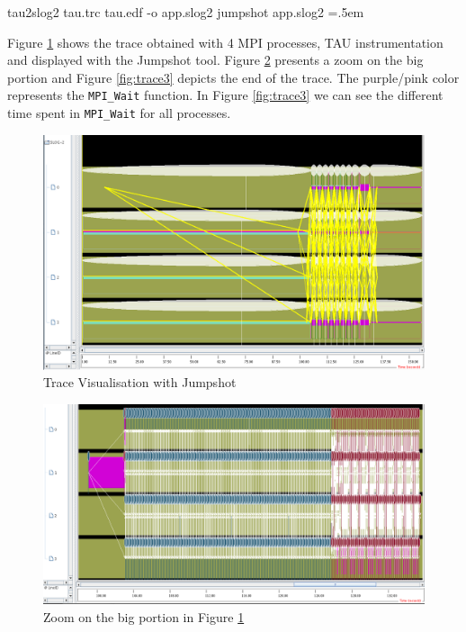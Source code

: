 \documentclass[10pt,twoside]{article}   	%
\newenvironment{cverbatim}
 {\SaveVerbatim{cverb}}
 {\endSaveVerbatim
  \flushleft\fboxrule=0pt\fboxsep=.5em
  \colorbox{cverbbg}{\BUseVerbatim{cverb}}%
  \endflushleft
}
\begin{document}
\begin{cverbatim}
tau2slog2 tau.trc tau.edf  -o app.slog2
jumpshot app.slog2
\end{cverbatim}

Figure \ref{fig:trace} shows the trace obtained with 4 MPI processes, TAU instrumentation and displayed with the Jumpshot tool. Figure \ref{fig:trace2} presents a zoom on the big portion and Figure \ref{fig:trace3} depicts the end of the trace. The purple/pink color represents the \texttt{MPI\_Wait} function. In Figure \ref{fig:trace3} we can see the different time spent in \texttt{MPI\_Wait} for all processes.

\begin{figure}[ht!]
\centering
\includegraphics[width=13cm]{IMAGES/jumpshot1}
\caption{Trace Visualisation with Jumpshot}
\label{fig:trace}
\end{figure}

\begin{figure}[ht!]
\centering
\includegraphics[width=13cm]{IMAGES/jumpshot2}
\caption{Zoom on the big portion in Figure \ref{fig:trace}}
\label{fig:trace2}
\end{figure}
\end{document}
